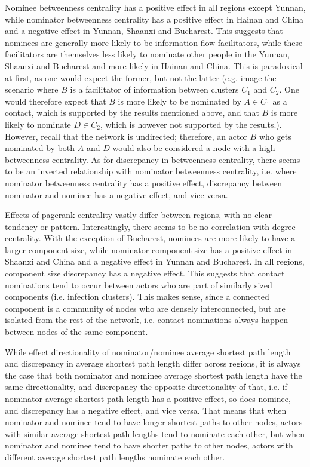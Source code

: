 Nominee betweenness centrality has a positive effect in all regions except Yunnan, while nominator betweenness centrality has a positive effect in Hainan and China and a negative effect in Yunnan, Shaanxi and Bucharest. This suggests that nominees are generally more likely to be information flow facilitators, while these facilitators are themselves less likely to nominate other people in the Yunnan, Shaanxi and Bucharest and more likely in Hainan and China. This is paradoxical at first, as one would expect the former, but not the latter (e.g. image the scenario where $B$ is a facilitator of information between clusters $C_1$ and $C_2$. One would therefore expect that $B$ is more likely to be nominated by $A\in C_1$ as a contact, which is supported by the results mentioned above, and that $B$ is more likely to nominate $D\in C_2$, which is however not supported by the results.). However, recall that the network is  undirected; therefore, an actor $B$ who gets nominated by both $A$ and $D$ would also be considered a node with a high betweenness centrality. As for discrepancy in betweenness centrality, there seems to be an inverted relationship with nominator betweenness centrality, i.e. where nominator betweenness centrality has a positive effect, discrepancy between nominator and nominee has a negative effect, and vice versa. 

Effects of pagerank centrality vastly differ between regions, with no clear tendency or pattern. Interestingly, there seems to be no correlation with degree centrality. With the exception of Bucharest, nominees are more likely to have a larger component size, while nominator component size has a positive effect in Shaanxi and China and a negative effect in Yunnan and Bucharest. In all regions, component size discrepancy has a negative effect. This suggests that contact nominations tend to occur between actors who are part of similarly sized components (i.e. infection clusters). This makes sense, since a connected component is a community of nodes who are densely interconnected, but are isolated from the rest of the network, i.e. contact nominations always happen between nodes of the same component.

While effect directionality of nominator/nominee average shortest path length and discrepancy in average shortest path length differ across regions, it is always the case that both nominator and nominee average shortest path length have the same directionality, and discrepancy the opposite directionality of that, i.e. if nominator average shortest path length has a positive effect, so does nominee, and discrepancy has a negative effect, and vice versa. That means that when nominator and nominee tend to have longer shortest paths to other nodes, actors with similar average shortest path lengths tend to nominate each other, but when nominator and nominee tend to have shorter paths to other nodes, actors with different average shortest path lengths nominate each other. 

